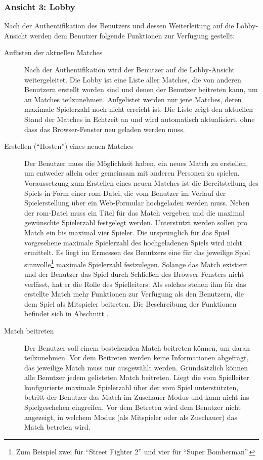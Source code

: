 \subsubsection*{Ansicht 3: Lobby}

Nach der Authentifikation des Benutzers und dessen Weiterleitung auf die
Lobby-Ansicht werden dem Benutzer folgende Funktionen zur Verfügung
gestellt:

\begin{description}
    \item [Auflisten der aktuellen Matches] Nach der Authentifikation wird der Benutzer auf die Lobby-Ansicht weitergeleitet. Die Lobby ist eine Liste aller Matches, die von anderen Benutzern erstellt worden sind und denen der Benutzer beitreten kann, um an Matches teilzunehmen. Aufgelistet werden nur jene Matches, deren maximale Spielerzahl noch nicht erreicht ist. Die Liste zeigt den aktuellen Stand der Matches in Echtzeit an und wird automatisch aktualisiert, ohne dass das Browser-Fenster neu geladen werden muss.
    \item [Erstellen (“Hosten”) eines neuen Matches] Der Benutzer muss die Möglichkeit haben, ein neues Match zu erstellen, um entweder allein oder gemeinsam mit anderen Personen zu spielen. Voraussetzung zum Erstellen eines neuen Matches ist die Bereitstellung des Spiels in Form einer \acrshort{rom}-Datei, die vom Benutzer im Verlauf der Spielerstellung über ein Web-Formular hochgeladen werden muss. Neben der \acrshort{rom}-Datei muss ein Titel für das Match vergeben und die maximal gewünschte Spielerzahl festgelegt werden. Unterstützt werden sollen pro Match ein bis maximal vier Spieler. Die ursprünglich für das Spiel vorgesehene maximale Spielerzahl des hochgeladenen Spiels wird nicht ermittelt. Es liegt im Ermessen des Benutzers eine für das jeweilige Spiel sinnvolle\footnote{Zum Beispiel zwei für “Street Fighter 2” und vier für “Super Bomberman”.} maximale Spielerzahl festzulegen. Solange das Match existiert und der Benutzer das Spiel durch Schließen des Browser-Fensters nicht verlässt, hat er die Rolle des Spielleiters. Als solches stehen ihm für das erstellte Match mehr Funktionen zur Verfügung als den Benutzern, die dem Spiel als Mitspieler beitreten. Die Beschreibung der Funktionen befindet sich in Abschnitt .
    \item [Match beitreten] Der Benutzer soll einem bestehenden Match beitreten können, um daran teilzunehmen. Vor dem Beitreten werden keine Informationen abgefragt, das jeweilige Match muss nur ausgewählt werden. Grundsätzlich können alle Benutzer jedem gelisteten Match beitreten. Liegt die vom Spielleiter konfigurierte maximale Spielerzahl über der vom Spiel unterstützten, betritt der Benutzer das Match im Zuschauer-Modus und kann nicht ins Spielgeschehen eingreifen. Vor dem Betreten wird dem Benutzer nicht angezeigt, in welchem Modus (als Mitspieler oder als Zuschauer) das Match betreten wird.
\end{description}
